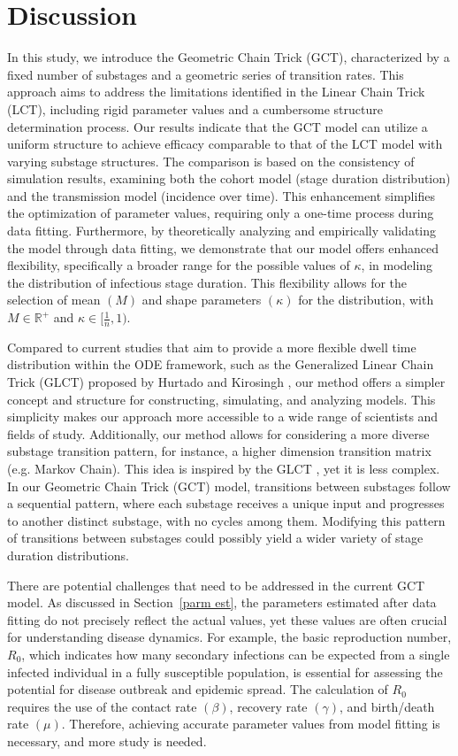 \documentclass[12pt]{article}
\newcommand{\sref}[1]{Section~\ref{#1}}
\begin{document}
\section{Discussion}
In this study, we introduce the Geometric Chain Trick (GCT), characterized by a fixed number of substages and a geometric series of transition rates. This approach aims to address the limitations identified in the Linear Chain Trick (LCT), including rigid parameter values and a cumbersome structure determination process. Our results indicate that the GCT model can utilize a uniform structure to achieve efficacy comparable to that of the LCT model with varying substage structures. The comparison is based on the consistency of simulation results, examining both the cohort model (stage duration distribution) and the transmission model (incidence over time). This enhancement simplifies the optimization of parameter values, requiring only a one-time process during data fitting. Furthermore, by theoretically analyzing and empirically validating the model through data fitting, we demonstrate that our model offers enhanced flexibility, specifically a broader range for the possible values of $\kappa$, in modeling the distribution of infectious stage duration. This flexibility allows for the selection of mean $(M)$ and shape parameters $(\kappa)$ for the distribution, with $M \in \mathbb{R}^+$ and $\kappa \in [\frac{1}{n}, 1)$.

Compared to current studies that aim to provide a more flexible dwell time distribution within the ODE framework, such as the Generalized Linear Chain Trick (GLCT) proposed by Hurtado and Kirosingh \cite{hurtado2019generalizations}, our method offers a simpler concept and structure for constructing, simulating, and analyzing models. This simplicity makes our approach more accessible to a wide range of scientists and fields of study. Additionally, our method allows for considering a more diverse substage transition pattern, for instance, a higher dimension transition matrix (e.g. Markov Chain). This idea is inspired by the GLCT \cite{hurtado2019generalizations}\cite{hurtado2021building}, yet it is less complex. In our Geometric Chain Trick (GCT) model, transitions between substages follow a sequential pattern, where each substage receives a unique input and progresses to another distinct substage, with no cycles among them. Modifying this pattern of transitions between substages could possibly yield a wider variety of stage duration distributions.

There are potential challenges that need to be addressed in the current GCT model. As discussed in \sref{parm est}, the parameters estimated after data fitting do not precisely reflect the actual values, yet these values are often crucial for understanding disease dynamics. For example, the basic reproduction number, $R_0$, which indicates how many secondary infections can be expected from a single infected individual in a fully susceptible population, is essential for assessing the potential for disease outbreak and epidemic spread. The calculation of $R_0$ requires the use of the contact rate $(\beta)$, recovery rate $(\gamma)$, and birth/death rate $(\mu)$. Therefore, achieving accurate parameter values from model fitting is necessary, and more study is needed.
\end{document}
